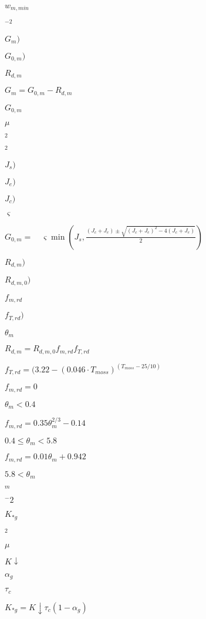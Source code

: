 \documentclass{article}
\begin{document}
{$w_{m,min} $
\pagebreak

$^{-2} $
\pagebreak

$G_m)$
\pagebreak

$G_{0,m})$
\pagebreak

$R_{d,m}$
\pagebreak

$ G_m=G_{0,m}-R_{d,m} $
\pagebreak

$G_{0,m} $
\pagebreak

$\mu $
\pagebreak

$_2 $
\pagebreak

$^2 $
\pagebreak

$J_s)$
\pagebreak

$J_e)$
\pagebreak

$J_c)$
\pagebreak

$\varsigma$
\pagebreak

$ G_{0,m} = \quad \varsigma \min \left(J_{s},\frac{(J_{c}+J_{e})\pm \sqrt{{(J_c +J_ e )}^2 - 4(J_c +J_e)} }{2}\right) $
\pagebreak

$R_{d,m})$
\pagebreak

$R_{d,m,0})$
\pagebreak

$f_{m,rd}$
\pagebreak

$f_{T,rd})$
\pagebreak

$\theta_m$
\pagebreak

$R_{d,m} = R_{d,m,0} f_{m,rd} f_{T,{rd}}$
\pagebreak

$ f_{T,{rd}} = (3.22-(0.046 \cdot T_{moss})^{(T_{moss}-25/10)} $
\pagebreak

$ f_{m,rd} = 0$
\pagebreak

$ \theta_{m} <0.4 $
\pagebreak

$ f_{m,rd} = 0.35 \theta_{m}^{2/3}-0.14$
\pagebreak

$ 0.4\le \theta_m<5.8 $
\pagebreak

$ f_{m,rd} = 0.01 \theta_{m} +0.942$
\pagebreak

$5.8<\theta _{m} $
\pagebreak

$_m$
\pagebreak

$^-2$
\pagebreak

$K_{\ast g}$
\pagebreak

$^2$
\pagebreak

$\mu$
\pagebreak

$K\downarrow $
\pagebreak

$\alpha_g$
\pagebreak

$\tau _c$
\pagebreak

$K_{\ast g} = K \downarrow \tau_{c}\left( 1-\alpha_{g}\right)$
\pagebreak

}
\end{document}
